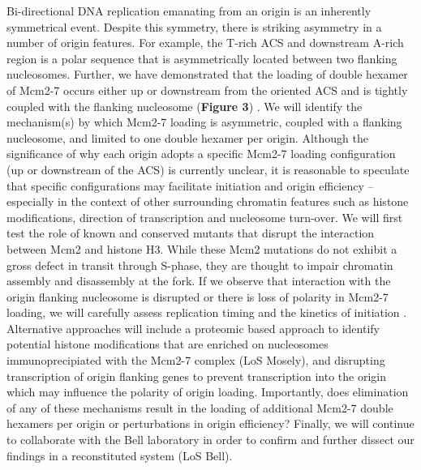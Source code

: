 Bi-directional DNA replication emanating from an origin is an inherently symmetrical event.  Despite this symmetry, there is striking asymmetry in a number of origin features.  For example, the T-rich ACS and downstream A-rich region is a polar sequence that is asymmetrically located between two flanking nucleosomes. Further, we have demonstrated that the loading of double hexamer of Mcm2-7 occurs either up or downstream from the oriented ACS and is tightly coupled with the flanking nucleosome ({\color{dukeblue}\textbf{Figure 3}}) \citep{Belsky2015-li}. We will identify the mechanism(s) by which Mcm2-7 loading is asymmetric, coupled with a flanking nucleosome, and limited to one double hexamer per origin.  Although the significance of why each origin adopts a specific Mcm2-7 loading configuration (up or downstream of the ACS) is currently unclear, it is reasonable to speculate that specific configurations may facilitate initiation and origin efficiency -- especially in the context of other surrounding chromatin features such as histone modifications, direction of transcription and nucleosome turn-over.  We will first test the role of known and conserved mutants that disrupt the interaction between Mcm2 and histone H3\citep{Huang2015-fk,Foltman2013-dk}.  While these Mcm2 mutations do not exhibit a gross defect in transit through S-phase, they are thought to impair chromatin assembly and disassembly at the fork\citep{Foltman2013-dk}.  If we observe that interaction with the origin flanking nucleosome is disrupted or there is loss of polarity in Mcm2-7 loading, we will carefully assess replication timing and the kinetics of initiation \invivo.  Alternative approaches will include a proteomic based approach to identify potential histone modifications that are enriched on nucleosomes immunoprecipiated with the Mcm2-7 complex (LoS Mosely), and disrupting transcription of origin flanking genes to prevent transcription into the origin which may influence the polarity of origin loading\citep{Gros2015-oo}.  Importantly, does elimination of any of these mechanisms result in the loading of additional Mcm2-7 double hexamers per origin or perturbations in origin efficiency? Finally, we will continue to collaborate with the Bell laboratory in order to confirm and further dissect our \invivo findings in a reconstituted system (LoS Bell).  

